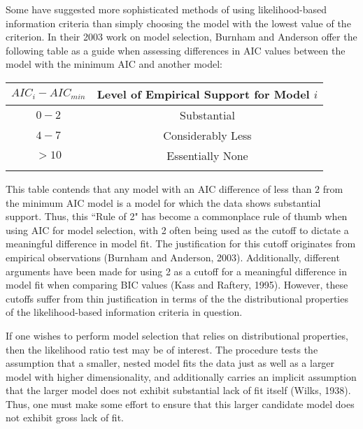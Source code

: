 		Some have suggested more sophisticated methods of using likelihood-based information criteria than simply choosing the model with the lowest value of the criterion. In their 2003 work on 
		model selection, Burnham and Anderson offer the following table as a guide when assessing differences in AIC values between the model with the minimum AIC and another model:
		\pagebreak

		\begin{table}[h]
		\centering
		{
		\begin{tabular}{ c|c}
		$AIC_{i}-AIC_{min}$ & Level of Empirical Support for Model $i$\\
		 \hline
		 $0 - 2$ & Substantial\\
		 $4 - 7$ & Considerably Less\\
		 $> 10$ & Essentially None\\
		 \Xhline{3\arrayrulewidth}
		\end{tabular}
		}
		\end{table}	
		
		This table contends that any model with an AIC difference of less than $2$ from the minimum AIC model is a model for which the data shows substantial support. Thus, this ``Rule of 2" has become a
		commonplace rule of thumb when using AIC for model selection, with 2 often being used as the cutoff to dictate a meaningful difference in model fit. The justification for this cutoff originates
		from empirical observations (Burnham and Anderson, 2003). Additionally, different  arguments have been made for using 2 as a cutoff for a meaningful difference in model fit
		when comparing BIC values (Kass and Raftery, 1995). However, these cutoffs suffer from thin justification in terms of the the distributional properties of the likelihood-based information
		criteria in question.

		If one wishes to perform model selection that relies on distributional properties, then the likelihood ratio test may be of interest. The procedure tests the assumption that
		a smaller, nested model fits the data just as well as a larger model with higher dimensionality, and additionally carries an implicit assumption that the larger model does
		not exhibit substantial lack of fit itself (Wilks, 1938). Thus, one must make some effort to ensure that this larger candidate model does not exhibit gross lack of fit.

